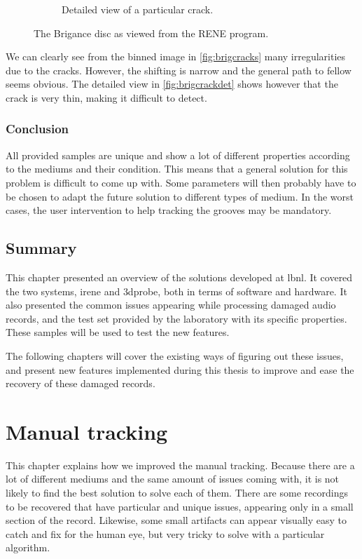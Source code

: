 \begin{figure}[!ht]
\begin{subfigure}[t]{0.45\textwidth}
    \caption{Detailed view of a particular crack.}
    \label{fig:brigcrackdet}
    \end{subfigure}
    \caption{The Brigance disc as viewed from the RENE program.}
    \label{fig:brigdamage}
\end{figure}

We can clearly see from the binned image in \autoref{fig:brigcracks} many irregularities due to the cracks. However, the shifting is narrow and the general path to fellow seems obvious. The detailed view in \autoref{fig:brigcrackdet} shows however that the crack is very thin, making it difficult to detect.

\subsection{Conclusion}

All provided samples are unique and show a lot of different properties according to the mediums and their condition. This means that a general solution for this problem is difficult to come up with. Some parameters will then probably have to be chosen to adapt the future solution to different types of medium. In the worst cases, the user intervention to help tracking the grooves may be mandatory.

\section{Summary}

This chapter presented an overview of the solutions developed at \gls{lbnl}. It covered the two systems, \gls{irene} and \gls{3dprobe}, both in terms of software and hardware. It also presented the common issues appearing while processing damaged audio records, and the test set provided by the laboratory with its specific properties. These samples will be used to test the new features.

The following chapters will cover the existing ways of figuring out these issues, and present new features implemented during this thesis to improve and ease the recovery of these damaged records.

\chapter{Manual tracking}
\label{chap:mantrack}

This chapter explains how we improved the manual tracking. Because there are a lot of different mediums and the same amount of issues coming with, it is not likely to find the best solution to solve each of them. There are some recordings to be recovered that have particular and unique issues, appearing only in a small section of the record. Likewise, some small artifacts can appear visually easy to catch and fix for the human eye, but very tricky to solve with a particular algorithm.

